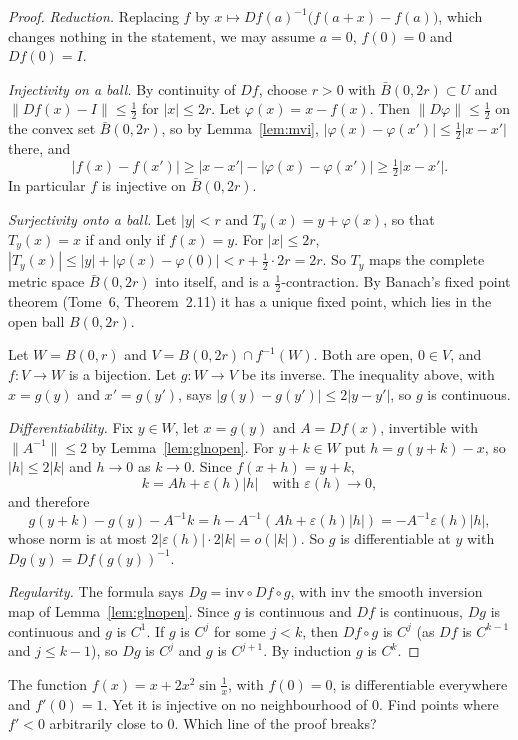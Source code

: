 \begin{proof}
\emph{Reduction.} Replacing $f$ by $x\mapsto Df(a)^{-1}\bigl(f(a+x)-f(a)\bigr)$, which changes nothing in the statement, we may assume $a=0$,
$f(0)=0$ and $Df(0)=I$.

\emph{Injectivity on a ball.} By continuity of $Df$, choose $r>0$ with $\bar B(0,2r)\subset U$ and $\|Df(x)-I\|\le\frac12$ for $|x|\le2r$. Let
$\varphi(x)=x-f(x)$. Then $\|D\varphi\|\le\frac12$ on the convex set $\bar B(0,2r)$, so by Lemma~\ref{lem:mvi}, $|\varphi(x)-\varphi(x')|\le\frac12|x-x'|$ there,
and
\[
|f(x)-f(x')|\ge|x-x'|-|\varphi(x)-\varphi(x')|\ge\tfrac12|x-x'|.
\]
In particular $f$ is injective on $\bar B(0,2r)$.

\emph{Surjectivity onto a ball.} Let $|y|<r$ and $T_y(x)=y+\varphi(x)$, so that $T_y(x)=x$ if and only if $f(x)=y$. For $|x|\le2r$,
$|T_y(x)|\le|y|+|\varphi(x)-\varphi(0)|<r+\frac12\cdot2r=2r$. So $T_y$ maps the complete metric space $\bar B(0,2r)$ into itself, and is a
$\frac12$-contraction. By Banach's fixed point theorem (Tome~6, Theorem~2.11) it has a unique fixed point, which lies in the open ball $B(0,2r)$.

Let $W=B(0,r)$ and $V=B(0,2r)\cap f^{-1}(W)$. Both are open, $0\in V$, and $f\colon V\to W$ is a bijection. Let $g\colon W\to V$ be its inverse. The
inequality above, with $x=g(y)$ and $x'=g(y')$, says $|g(y)-g(y')|\le2|y-y'|$, so $g$ is continuous.

\emph{Differentiability.} Fix $y\in W$, let $x=g(y)$ and $A=Df(x)$, invertible with $\|A^{-1}\|\le2$ by Lemma~\ref{lem:glnopen}. For $y+k\in W$ put
$h=g(y+k)-x$, so $|h|\le2|k|$ and $h\to0$ as $k\to0$. Since $f(x+h)=y+k$,
\[
k=Ah+\varepsilon(h)|h|\quad\text{with }\varepsilon(h)\to0,
\]
and therefore
\[
g(y+k)-g(y)-A^{-1}k=h-A^{-1}(Ah+\varepsilon(h)|h|)=-A^{-1}\varepsilon(h)|h|,
\]
whose norm is at most $2|\varepsilon(h)|\cdot2|k|=o(|k|)$. So $g$ is differentiable at $y$ with $Dg(y)=Df(g(y))^{-1}$.

\emph{Regularity.} The formula says $Dg=\mathrm{inv}\circ Df\circ g$, with $\mathrm{inv}$ the smooth inversion map of Lemma~\ref{lem:glnopen}. Since $g$
is continuous and $Df$ is continuous, $Dg$ is continuous and $g$ is $C^1$. If $g$ is $C^j$ for some $j<k$, then $Df\circ g$ is $C^{j}$ (as $Df$ is
$C^{k-1}$ and $j\le k-1$), so $Dg$ is $C^j$ and $g$ is $C^{j+1}$. By induction $g$ is $C^k$.
\end{proof}

\begin{think}
The function $f(x)=x+2x^2\sin\frac1x$, with $f(0)=0$, is differentiable everywhere and $f'(0)=1$. Yet it is injective on no neighbourhood of $0$. Find
points where $f'<0$ arbitrarily close to $0$. Which line of the proof breaks?
\end{think}

